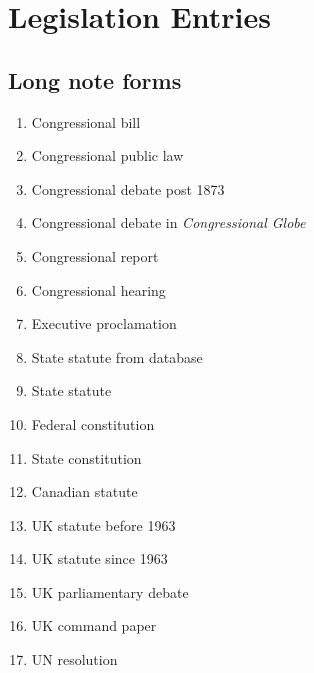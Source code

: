 \documentclass[a4paper,12pt]{article}
\begin{document}
\section*{Legislation Entries}
\label{legis}

\subsection*{Long note forms}
\label{legis:long}
\begin{enumerate}\setlength{\parskip}{-4pt}
\setcounter{enumi}{15}
\item Congressional bill\autocite{congress:bill}
\item Congressional public law\autocite{congress:publiclaw}
\item Congressional debate post 1873\autocite{congress:debate:new}
\item Congressional debate in \emph{Congressional
    Globe}\autocite{congress:debate:globe}
\item Congressional report\autocite{congress:report}
\item Congressional hearing\autocite{congress:hearing}
\item Executive proclamation\autocite{executive:proclamation}
\item State statute from database\autocite{state:statute:ky}
\item State statute\autocite{state:statute:okla}
\item Federal constitution\autocite{constitution:federal}
\item State constitution\autocite{constitution:arkansas}
\item Canadian statute\autocite{canada:statute}
\item UK statute before 1963\autocite{uk:statute:regnal}
\item UK statute since 1963\autocite{uk:statute}
\item UK parliamentary debate\autocite{uk:hansard}
\item UK command paper\autocite{uk:command}
\item UN resolution\autocite{un:resolution}
\end{enumerate}
\end{document}
